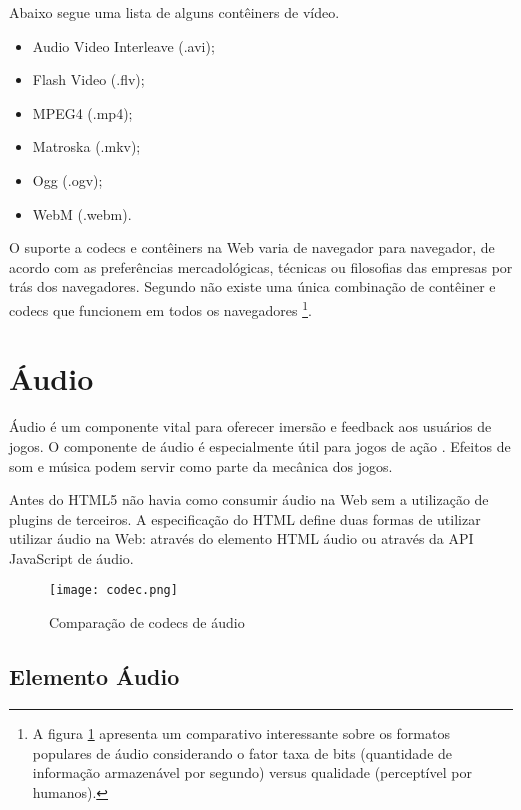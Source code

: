 \noindent Abaixo segue uma lista de alguns contêiners de vídeo.
\begin{itemize}
    \item Audio Video Interleave (.avi);
    \item Flash Video (.flv);
    \item MPEG4 (.mp4);
    \item Matroska (.mkv);
    \item Ogg (.ogv);
    \item WebM (.webm).
\end{itemize}

O suporte a codecs e contêiners na Web varia de navegador para
navegador, de acordo com as preferências mercadológicas, técnicas
ou filosofias das empresas por trás dos navegadores. Segundo
\citet{diveIntohtml} não existe uma única combinação de contêiner
e codecs que funcionem em todos os navegadores \footnote{A figura
\ref{fig:audioCodecs} apresenta um comparativo interessante sobre
os formatos populares de áudio considerando o fator taxa de bits
(quantidade de informação armazenável por segundo) versus qualidade
(perceptível por humanos).}.

\section{Áudio}

Áudio é um componente vital para oferecer imersão e feedback aos
usuários de jogos. O componente de áudio é especialmente útil para
jogos de ação \autocite{browserGamesTechnologyAndFuture}. Efeitos
de som e música podem servir como parte da mecânica dos jogos.

Antes do HTML5 não havia como consumir áudio na Web sem a utilização de
plugins de terceiros. A especificação do HTML define duas formas de
utilizar utilizar áudio na Web: através do elemento HTML áudio ou
através da API JavaScript de áudio.

\begin{figure}[H]
    \centering
    \texttt{[image: codec.png]}
	\caption{Comparação de codecs de áudio}
    \label{fig:audioCodecs}
\end{figure}

\subsection{Elemento Áudio}

